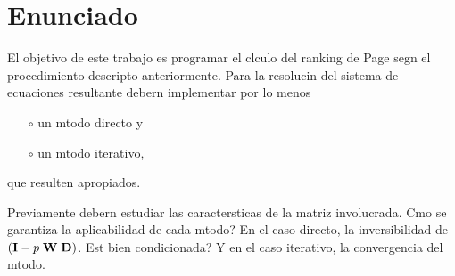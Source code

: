 






\section*{Enunciado}

El objetivo de este trabajo es programar el clculo del ranking de Page segn el procedimiento descripto anteriormente.
Para la resolucin del sistema de ecuaciones resultante debern implementar por lo menos
\begin{itemize}
  \setlength{\itemsep}{0pt}
  \setlength{\parskip}{0pt}
  \setlength{\parsep}{0pt}
    \item[$\circ$] un mtodo directo y
    \item[$\circ$] un mtodo iterativo,
\end{itemize}  
que resulten apropiados.

Previamente debern estudiar las caractersticas de la matriz involucrada. Cmo se garantiza la aplicabilidad de cada mtodo?
En el caso directo, la inversibilidad de $({\bf I} - p \; {\bf W} \; {\bf D})$. Est bien condicionada? 
Y en el caso iterativo, la convergencia del mtodo.

